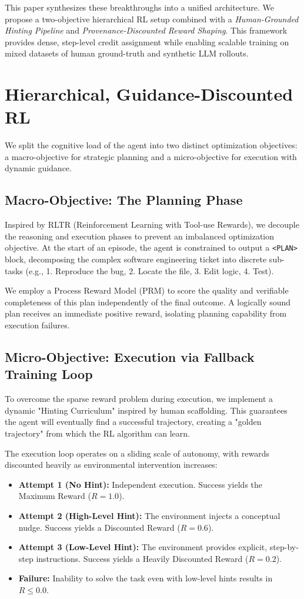 \documentclass[10pt, letterpaper]{article}
\begin{document}
This paper synthesizes these breakthroughs into a unified architecture. We propose a two-objective hierarchical RL setup combined with a \textit{Human-Grounded Hinting Pipeline} and \textit{Provenance-Discounted Reward Shaping}. This framework provides dense, step-level credit assignment while enabling scalable training on mixed datasets of human ground-truth and synthetic LLM rollouts.

\section{Hierarchical, Guidance-Discounted RL}

We split the cognitive load of the agent into two distinct optimization objectives: a macro-objective for strategic planning and a micro-objective for execution with dynamic guidance.

\subsection{Macro-Objective: The Planning Phase}
Inspired by RLTR (Reinforcement Learning with Tool-use Rewards), we decouple the reasoning and execution phases to prevent an imbalanced optimization objective. At the start of an episode, the agent is constrained to output a \texttt{<PLAN>} block, decomposing the complex software engineering ticket into discrete sub-tasks (e.g., 1. Reproduce the bug, 2. Locate the file, 3. Edit logic, 4. Test).

We employ a Process Reward Model (PRM) to score the quality and verifiable completeness of this plan independently of the final outcome. A logically sound plan receives an immediate positive reward, isolating planning capability from execution failures.

\subsection{Micro-Objective: Execution via Fallback Training Loop}
To overcome the sparse reward problem during execution, we implement a dynamic "Hinting Curriculum" inspired by human scaffolding. This guarantees the agent will eventually find a successful trajectory, creating a "golden trajectory" from which the RL algorithm can learn.

The execution loop operates on a sliding scale of autonomy, with rewards discounted heavily as environmental intervention increases:
\begin{itemize}
    \item \textbf{Attempt 1 (No Hint):} Independent execution. Success yields the Maximum Reward ($R = 1.0$).
    \item \textbf{Attempt 2 (High-Level Hint):} The environment injects a conceptual nudge. Success yields a Discounted Reward ($R = 0.6$).
    \item \textbf{Attempt 3 (Low-Level Hint):} The environment provides explicit, step-by-step instructions. Success yields a Heavily Discounted Reward ($R = 0.2$).
    \item \textbf{Failure:} Inability to solve the task even with low-level hints results in $R \le 0.0$.
\end{itemize}
\end{document}
